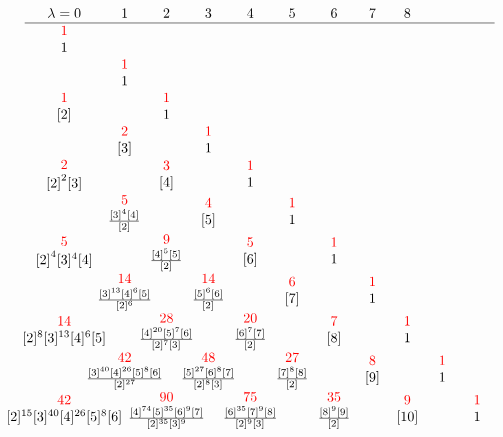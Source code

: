 %
%
%
%
\[ { } \hspace{-.53in} 
\begin{array}{ccccccccccccccccc}
  \lambda=0         &  1             &  2      &  3  &  4  &  5   & 6 & 7 & 8 
  \\ \hline
 \du{1}{1} \\ 
                  & \du{1}{1}  \\ 
 \du{1}{{[2]}}     &                  & \du{1}{1} \\ 
                  & \du{2}{[3]}                &     & \du{1}{1}   \\ 
 \du{2}{{[ 2]}^2 [3]}  &                     & \du{3}{[4]} &    & \du{1}{1}  \\
               & \du{5}{{\frac{ [3]^4 [4]}{[2]}^{}}} &  & \du{4}{[5]} &  & \du{1}{1} \\ 
 \du{5}{{[2]}^4 [3]^4 [4]} &              & \du{9}{{\frac{[4]^5[5]}{[2]}^{}}} &    & \du{5}{[6]} & & \du{1}{1}  \\
              & \du{14}{\frac{[3]^{13}[4]^6[5]}{[2]^{6}}} &&\du{14}{\frac{[5]^6[6]}{[2]^{}}} && \du{6}{[7]} && \du{1}{1}
 \\
 \du{14}{[2]^8[3]^{13}[4]^6[5]}  &&      \du{28}{\frac{[4]^{20}[5]^7[6]}{[2]^{7}[3]^{}}} && \du{20}{\frac{[6]^7[7]}{[2]^{}}} && \du{7}{[8]}  &&  \du{1}{1} \\
              & \du{42}{\frac{[3]^{40}[4]^{26}[5]^8[6]}{[2]^{27}}} && \du{48}{\frac{[5]^{27}[6]^8[7]}{[2]^{8}[3]^{}}} && \du{27}{\frac{[7]^8[8]}{[2]^{}}} && \du{8}{[9]} && \du{1}{1}
 \\
 \du{42}{[2]^{15}[3]^{40}[4]^{26}[5]^{8}[6]} && \du{90}{\frac{[4]^{74}[5]^{35}[6]^{9}[7]}{[2]^{35}[3]^{9}}} && \du{75}{
 \frac{  [6]^{35}[7]^{9}[8]}{[2]^{9}[3]^{}}} && \du{35}{\frac{[8]^9[9]}{[2]^{}}} && \du{9}{[10]} && \du{1}{1}
\end{array}
\]

